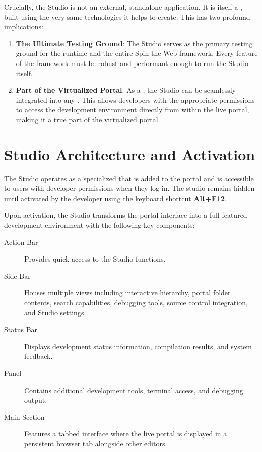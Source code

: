 Crucially, the Studio is not an external, standalone application. It is itself a \textbf{\webbaselet{}}, built using the very same technologies it helps to create. This has two profound implications:

\begin{enumerate}
    \item \textbf{The Ultimate Testing Ground}: The Studio serves as the primary testing ground for the \webspinner{} runtime and the entire Spin the Web framework. Every feature of the framework must be robust and performant enough to run the Studio itself.
    \item \textbf{Part of the Virtualized Portal}: As a \webbaselet{}, the Studio can be seamlessly integrated into any \webbase{}. This allows developers with the appropriate permissions to access the development environment directly from within the live portal, making it a true part of the virtualized portal.
\end{enumerate}

\section{Studio Architecture and Activation}
\label{sec:studio-architecture}

The Studio operates as a specialized \webbaselet{} that is added to the portal \webbase{} and is accessible to users with developer permissions when they log in. The studio remains hidden until activated by the developer using the keyboard shortcut \textbf{Alt+F12}.

Upon activation, the Studio transforms the portal interface into a full-featured development environment with the following key components:

\begin{description}
    \item[Action Bar] Provides quick access to the Studio functions.
    \item[Side Bar] Houses multiple views including interactive \webbase{} hierarchy, portal folder contents, search capabilities, debugging tools, source control integration, and Studio settings.
    \item[Status Bar] Displays development status information, compilation results, and system feedback.
    \item[Panel] Contains additional development tools, terminal access, and debugging output.
    \item[Main Section] Features a tabbed interface where the live portal is displayed in a persistent browser tab alongside other editors.
\end{description}

